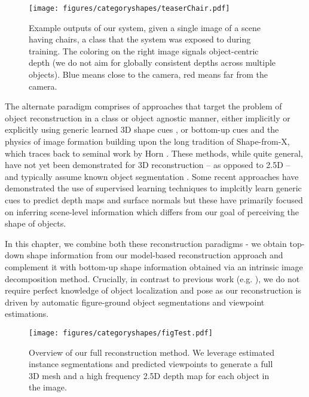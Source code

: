 \begin{figure}[t]
\texttt{[image: figures/categoryshapes/teaserChair.pdf]}
\caption{Example outputs of our system, given a single image of a scene having chairs, a class that the system was exposed to during training. The coloring on the right image signals object-centric depth (we do not aim for globally consistent depths across multiple objects). Blue means close to the camera, red means far from the camera.}
\end{figure}

The alternate paradigm comprises of approaches that target the problem of object reconstruction in a class or object agnostic manner, either implicitly or explicitly using generic learned 3D shape cues \cite{hoiem2005automatic, saxena2009make3d}, or bottom-up cues and the physics of image formation \cite{Karsch2013,barronPAMI13} building upon the long tradition of Shape-from-X, which traces back to seminal work by Horn \cite{HORNThesis1970}. These methods, while quite general, have not yet been demonstrated for 3D reconstruction -- as opposed to 2.5D -- and typically assume known object segmentation \cite{barronPAMI13}. Some recent approaches have demonstrated the use of supervised learning techniques to implcitly learn generic cues to predict depth maps \cite{eigennips14} and surface normals \cite{eigen2015predicting, wang2015designing} but these have primarily focused on  inferring scene-level information which differs from our goal of perceiving the shape of objects.

In this chapter, we combine both these reconstruction paradigms - we obtain top-down shape information from our model-based reconstruction approach and complement it with bottom-up shape information obtained via an intrinsic image decomposition method.  Crucially, in contrast to previous work (e.g. \cite{barronPAMI13,carvi14,cashman2013dolphins}), we do not require perfect knowledge of object localization and pose as our reconstruction is driven by automatic figure-ground object segmentations and viewpoint estimations.

\begin{figure}[t]
\centering
\texttt{[image: figures/categoryshapes/figTest.pdf]}
\caption{Overview of our full reconstruction method. We leverage estimated instance segmentations and predicted viewpoints to generate a full 3D mesh and a high frequency 2.5D depth map for each object in the image.}
\end{figure}

